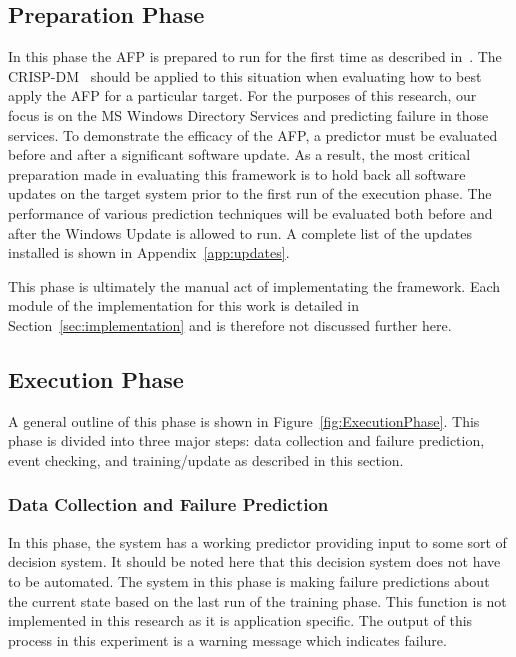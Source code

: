 \subsection{Preparation Phase}
In this phase the \ac{AFP} is prepared to run for the first time as described
in~\cite{irrera2015}.  The \ac{CRISP-DM}~\cite{crispdm} should be applied to
this situation when evaluating how to best apply the \ac{AFP} for a particular
target.  For the purposes of this research, our focus is on the \ac{MS}
Windows Directory Services and predicting failure in those services.  To
demonstrate the efficacy of the \ac{AFP}, a predictor must be evaluated before
and after a significant software update.  As a result, the most critical
preparation made in evaluating this framework is to hold back all software
updates on the target system prior to the first run of the execution phase.
The performance of various prediction techniques will be evaluated both before
and after the Windows Update is allowed to run.  A complete list of the updates
installed is shown in Appendix~\ref{app:updates}.

This phase is ultimately the manual act of implementating the framework.  Each
module of the implementation for this work is detailed in
Section~\ref{sec:implementation} and is therefore not discussed further here.  

\subsection{Execution Phase}
A general outline of this phase is shown in Figure~\ref{fig:ExecutionPhase}.
This phase is divided into three major steps: data collection and failure
prediction, event checking, and training/update as described in this section.

\figExecutionPhase{2.5in}

\subsubsection{Data Collection and Failure Prediction}
In this phase, the system has a working predictor providing input to some sort
of decision system.  It should be noted here that this decision system does not
have to be automated.  The system in this phase is making failure predictions
about the current state based on the last run of the training phase.  This
function is not implemented in this research as it is application specific.
The output of this process in this experiment is a warning message which
indicates failure.

